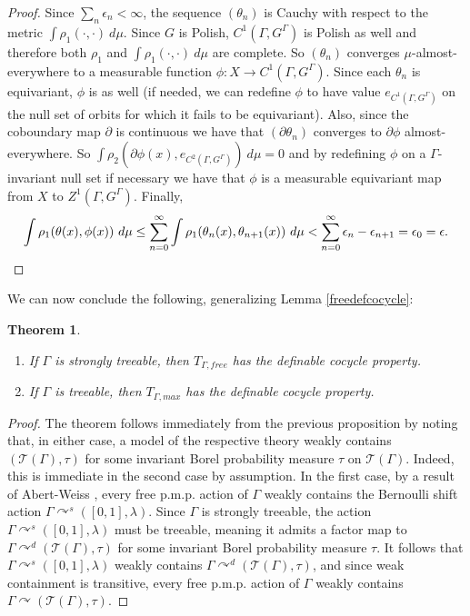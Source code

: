 \documentclass[12pt]{amsart}
\newtheorem{thm}{Theorem}[section]
\theoremstyle{definition}
\def\cal{\mathcal}
\newcommand{\pmp}{p{$.$}m{$.$}p{$.$}}
\newcommand{\acts}{\curvearrowright}
\begin{document}
\begin{proof}
	Since $\sum_n \epsilon_n < \infty$, the sequence $(\theta_n)$ is Cauchy with respect to the metric $\int \rho_1(\cdot, \cdot) \ d \mu$. Since $G$ is Polish, $C^1(\Gamma, G^\Gamma)$ is Polish as well and therefore both $\rho_1$ and $\int \rho_1(\cdot, \cdot) \ d \mu$ are complete. So $(\theta_n)$ converges $\mu$-almost-everywhere to a measurable function $\phi : X \rightarrow C^1(\Gamma, G^\Gamma)$. Since each $\theta_n$ is equivariant, $\phi$ is as well (if needed, we can redefine $\phi$ to have value $e_{C^1(\Gamma, G^\Gamma)}$ on the null set of orbits for which it fails to be equivariant). Also, since the coboundary map $\partial$ is continuous we have that $(\partial \theta_n)$ converges to $\partial \phi$ almost-everywhere. So $\int \rho_2(\partial \phi(x), e_{C^2(\Gamma, G^\Gamma)}) \ d \mu = 0$ and by redefining $\phi$ on a $\Gamma$-invariant null set if necessary we have that $\phi$ is a measurable equivariant map from $X$ to $Z^1(\Gamma, G^\Gamma)$. Finally,
	\[\int \rho_1(\theta(x), \phi(x)) \ d \mu \leq \sum_{n=0}^\infty \int \rho_1(\theta_n(x), \theta_{n+1}(x)) \ d \mu < \sum_{n=0}^\infty \epsilon_n-\epsilon_{n+1} = \epsilon_0 = \epsilon.\qedhere\]
\end{proof}

We can now conclude the following, generalizing Lemma \ref{freedefcocycle}:

\begin{thm}\label{treeabledefcocyle} \
	\begin{enumerate}
		\item If $\Gamma$ is strongly treeable, then $T_{\Gamma,free}$ has the definable cocycle property.
		\item If $\Gamma$ is treeable, then $T_{\Gamma,max}$ has the definable cocycle property.
	\end{enumerate}
\end{thm}

\begin{proof}
	The theorem follows immediately from the previous proposition by noting that, in either case, a model of the respective theory weakly contains $(\cal T(\Gamma),\tau)$ for some invariant Borel probability measure $\tau$ on $\cal T(\Gamma)$.  Indeed, this is immediate in the second case by assumption.  In the first case, by a result of Abert-Weiss \cite{AW13}, every free {\pmp} action of $\Gamma$ weakly contains the Bernoulli shift action $\Gamma \acts^s ([0,1], \lambda)$. Since $\Gamma$ is strongly treeable, the action $\Gamma \acts^s ([0,1], \lambda)$ must be treeable, meaning it admits a factor map to $\Gamma \acts^d (\cal T(\Gamma), \tau)$ for some invariant Borel probability measure $\tau$. It follows that $\Gamma \acts^s ([0,1], \lambda)$ weakly contains $\Gamma \acts^d (\cal T(\Gamma), \tau)$, and since weak containment is transitive, every free {\pmp} action of $\Gamma$ weakly contains $\Gamma \acts (\cal T(\Gamma), \tau)$.
\end{proof}
\end{document}
